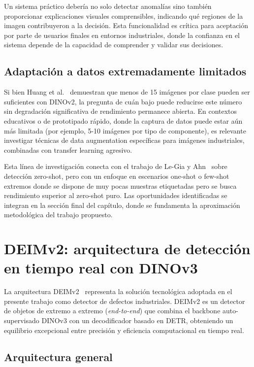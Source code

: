Un sistema práctico debería no solo detectar anomalías sino también proporcionar explicaciones visuales comprensibles, indicando qué regiones de la imagen contribuyeron a la decisión. Esta funcionalidad es crítica para aceptación por parte de usuarios finales en entornos industriales, donde la confianza en el sistema depende de la capacidad de comprender y validar sus decisiones.

\subsection{Adaptación a datos extremadamente limitados}

Si bien Huang et al.~\cite{huang2025semiconductor} demuestran que menos de 15 imágenes por clase pueden ser suficientes con DINOv2, la pregunta de cuán bajo puede reducirse este número sin degradación significativa de rendimiento permanece abierta. En contextos educativos o de prototipado rápido, donde la captura de datos puede estar aún más limitada (por ejemplo, 5-10 imágenes por tipo de componente), es relevante investigar técnicas de data augmentation específicas para imágenes industriales, combinadas con transfer learning agresivo.

Esta línea de investigación conecta con el trabajo de Le-Gia y Ahn~\cite{legia2025consistent} sobre detección zero-shot, pero con un enfoque en escenarios one-shot o few-shot extremos donde se dispone de muy pocas muestras etiquetadas pero se busca rendimiento superior al zero-shot puro. Las oportunidades identificadas se integran en la sección final del capítulo, donde se fundamenta la aproximación metodológica del trabajo propuesto.

\section{DEIMv2: arquitectura de detección en tiempo real con DINOv3}
\label{sec:deimv2}

La arquitectura \acrfull{DEIMv2}~\cite{huang2025deimv2} representa la solución tecnológica adoptada en el presente trabajo como detector de defectos industriales. DEIMv2 es un detector de objetos de extremo a extremo (\textit{end-to-end}) que combina el backbone auto-supervisado \acrshort{DINOv3} con un decodificador basado en \acrshort{DETR}, obteniendo un equilibrio excepcional entre precisión y eficiencia computacional en tiempo real.

\subsection{Arquitectura general}

